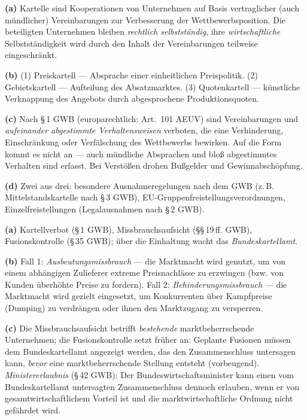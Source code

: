 \documentclass[11pt, a4paper]{article}
\begin{document}
\begin{loesung}[title={Lösung Aufgabe~2 --- Kartellverbot und Kartellarten}]
\textbf{(a)} Kartelle sind Kooperationen von Unternehmen auf Basis vertraglicher
(auch mündlicher) Vereinbarungen zur Verbesserung der Wettbewerbsposition. Die
beteiligten Unternehmen bleiben \emph{rechtlich selbstständig}, ihre
\emph{wirtschaftliche} Selbstständigkeit wird durch den Inhalt der Vereinbarungen
teilweise eingeschränkt.

\textbf{(b)} (1) Preiskartell --- Absprache einer einheitlichen Preispolitik.
(2) Gebietskartell --- Aufteilung des Absatzmarktes. (3) Quotenkartell --- künstliche
Verknappung des Angebots durch abgesprochene Produktionsquoten.

\textbf{(c)} Nach \S\,1 GWB (europarechtlich: Art.~101 AEUV) sind Vereinbarungen und
\emph{aufeinander abgestimmte Verhaltensweisen} verboten, die eine Verhinderung,
Einschränkung oder Verfälschung des Wettbewerbs bewirken. Auf die Form kommt es nicht an
--- auch mündliche Absprachen und bloß abgestimmtes Verhalten sind erfasst. Bei Verstößen
drohen Bußgelder und Gewinnabschöpfung.

\textbf{(d)} Zwei aus drei: besondere Ausnahmeregelungen nach dem GWB (z.\,B.
Mittelstandskartelle nach \S\,3 GWB), EU-Gruppenfreistellungsverordnungen,
Einzelfreistellungen (Legalausnahmen nach \S\,2 GWB).
\end{loesung}

\begin{loesung}[title={Lösung Aufgabe~3 --- Missbrauchsaufsicht und Fusionskontrolle}]
\textbf{(a)} Kartellverbot (\S\,1 GWB), Missbrauchsaufsicht (\S\S\,19\,ff. GWB),
Fusionskontrolle (\S\,35 GWB); über die Einhaltung wacht das \emph{Bundeskartellamt}.

\textbf{(b)} Fall 1: \emph{Ausbeutungsmissbrauch} --- die Marktmacht wird genutzt, um von
einem abhängigen Zulieferer extreme Preisnachlässe zu erzwingen (bzw. von Kunden
überhöhte Preise zu fordern). Fall 2: \emph{Behinderungsmissbrauch} --- die Marktmacht
wird gezielt eingesetzt, um Konkurrenten über Kampfpreise (Dumping) zu verdrängen oder
ihnen den Marktzugang zu versperren.

\textbf{(c)} Die Missbrauchsaufsicht betrifft \emph{bestehende} marktbeherrschende
Unternehmen; die Fusionskontrolle setzt früher an: Geplante Fusionen müssen dem
Bundeskartellamt angezeigt werden, das den Zusammenschluss untersagen kann, \emph{bevor}
eine marktbeherrschende Stellung entsteht (vorbeugend). \emph{Ministererlaubnis}
(\S\,42 GWB): Der Bundeswirtschaftsminister kann einen vom Bundeskartellamt untersagten
Zusammenschluss dennoch erlauben, wenn er von gesamtwirtschaftlichem Vorteil ist und die
marktwirtschaftliche Ordnung nicht gefährdet wird.
\end{loesung}
\end{document}
